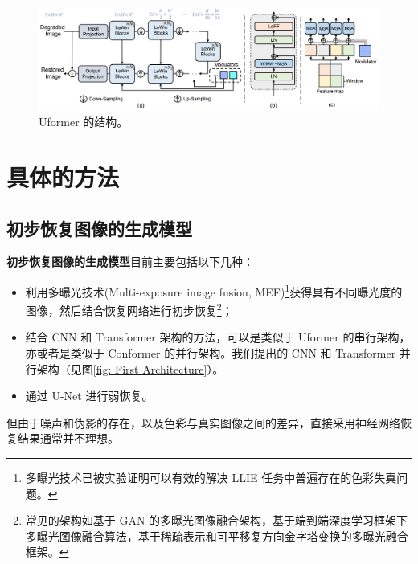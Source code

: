 \documentclass[a4paper]{ctexart}
\begin{document}
	\begin{figure}[htb]
		\centering 
		\includegraphics[width=\columnwidth]{picture/LLIE/Uformer/Uformer}
		\caption{
			\label{fig: Uformer} 
			Uformer 的结构。
		}
	\end{figure}
	
	\section{具体的方法}
	
	\subsection{初步恢复图像的生成模型}
	
	\textbf{初步恢复图像的生成模型}目前主要包括以下几种：
	
	\begin{itemize}
		\item[(1)] 
		利用多曝光技术(Multi-exposure image fusion, MEF)\footnote{多曝光技术已被实验证明可以有效的解决 LLIE 任务中普遍存在的色彩失真问题。}获得具有不同曝光度的图像，然后结合恢复网络进行初步恢复\footnote{常见的架构如基于 GAN 的多曝光图像融合架构，基于端到端深度学习框架下多曝光图像融合算法，基于稀疏表示和可平移复方向金字塔变换的多曝光融合框架。}\cite{burt1984pyramid}；
		
		\item[(2)]
		结合 CNN 和 Transformer 架构的方法，可以是类似于 Uformer \cite{wang2022uformer}的串行架构，亦或者是类似于 Conformer 的并行架构。我们提出的 CNN 和 Transformer 并行架构（见图\ref{fig: First Architecture}）。
		
		\item[(3)]
		通过 U-Net 进行弱恢复。
		
	\end{itemize}	
	
	但由于噪声和伪影的存在，以及色彩与真实图像之间的差异，直接采用神经网络恢复结果通常并不理想。
	
\end{document}

